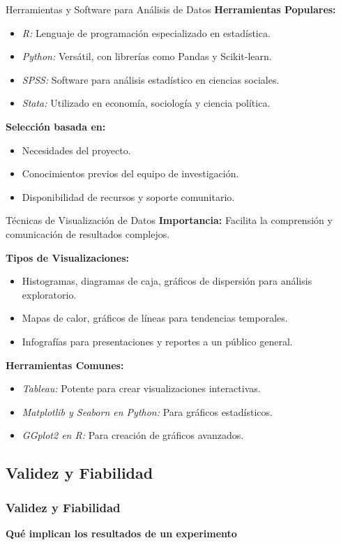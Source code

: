 ﻿\documentclass{beamer}
\begin{document}
\begin{frame}{Herramientas y Software para Análisis de Datos}
\textbf{Herramientas Populares:}
\begin{itemize}
    \item \textit{R:} Lenguaje de programación especializado en estadística.
    \item \textit{Python:} Versátil, con librerías como Pandas y Scikit-learn.
    \item \textit{SPSS:} Software para análisis estadístico en ciencias sociales.
    \item \textit{Stata:} Utilizado en economía, sociología y ciencia política.
\end{itemize}
\textbf{Selección basada en:}
\begin{itemize}
    \item Necesidades del proyecto.
    \item Conocimientos previos del equipo de investigación.
    \item Disponibilidad de recursos y soporte comunitario.
\end{itemize}
\end{frame}

\begin{frame}{Técnicas de Visualización de Datos}
\textbf{Importancia:} Facilita la comprensión y comunicación de resultados complejos.

\textbf{Tipos de Visualizaciones:}
\begin{itemize}
    \item Histogramas, diagramas de caja, gráficos de dispersión para análisis exploratorio.
    \item Mapas de calor, gráficos de líneas para tendencias temporales.
    \item Infografías para presentaciones y reportes a un público general.
\end{itemize}
\textbf{Herramientas Comunes:}
\begin{itemize}
    \item \textit{Tableau:} Potente para crear visualizaciones interactivas.
    \item \textit{Matplotlib y Seaborn en Python:} Para gráficos estadísticos.
    \item \textit{GGplot2 en R:} Para creación de gráficos avanzados.
\end{itemize}
\end{frame}

\subsection{Validez y Fiabilidad}
\begin{frame}
    \frametitle{Validez y Fiabilidad}
    \centering
    \textbf{\Large Qué implican los resultados de un experimento}
    \vspace{0.5cm}
\end{frame}
\end{document}
